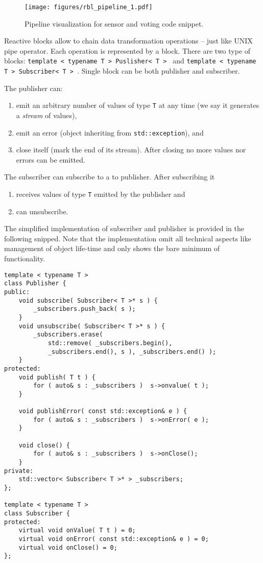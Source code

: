 \begin{figure}[!t]
    \centering
    \texttt{[image: figures/rbl\_pipeline\_1.pdf]}
    \caption{Pipeline visualization for sensor and voting code snippet.}
    \label{fig:rbl_example_1}
\end{figure}

Reactive blocks allow to chain data transformation operations -- just like UNIX
pipe operator. Each operation is represented by a block. There are two type of
blocks: \texttt{template < typename T > Puslisher< T > }
and \texttt{template < typename T > Subscriber< T > }.
Single block can be both publisher and subscriber.

\noindent The publisher can:
\begin{enumerate}
    \item emit an arbitrary number of values of type \texttt{T} at any time (we
    say it generates a \emph{stream} of values),
    \item emit an error (object inheriting from
    \texttt{std::exception}), and
    \item close itself (mark the end of its stream). After closing no more
    values nor errors can be emitted.
\end{enumerate}

\noindent The subscriber can subscribe to a to publisher. After subscribing it
\begin{enumerate}
    \item receives values of type \texttt{T} emitted by the publisher and
    \item can unsubscribe.
\end{enumerate}

The simplified implementation of subscriber and publisher is provided in the
following snipped. Note that the implementation omit all technical aspects like
management of object life-time and only shows the bare minimum of functionality.
\begin{verbatim}
template < typename T >
class Publisher {
public:
    void subscribe( Subscriber< T >* s ) {
        _subscribers.push_back( s );
    }
    void unsubscribe( Subscriber< T >* s ) {
        _subscribers.erase(
            std::remove( _subscribers.begin(),
            _subscribers.end(), s ), _subscribers.end() );
    }
protected:
    void publish( T t ) {
        for ( auto& s : _subscribers )  s->onvalue( t );
    }

    void publishError( const std::exception& e ) {
        for ( auto& s : _subscribers )  s->onError( e );
    }

    void close() {
        for ( auto& s : _subscribers )  s->onClose();
    }
private:
    std::vector< Subscriber< T >* > _subscribers;
};

template < typename T >
class Subscriber {
protected:
    virtual void onValue( T t ) = 0;
    virtual void onError( const std::exception& e ) = 0;
    virtual void onClose() = 0;
};
\end{verbatim}

